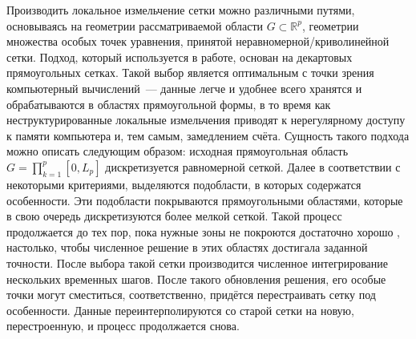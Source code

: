 Производить локальное измельчение сетки можно различными путями, основываясь на геометрии рассматриваемой области $G\subset\mathbb{R}^p$, геометрии множества особых точек уравнения, принятой неравномерной/криволинейной сетки.
Подход, который используется в работе, основан на декартовых прямоугольных сетках.
Такой выбор является оптимальным с точки зрения компьютерный вычислений~--- данные легче и удобнее всего хранятся и обрабатываются в областях прямоугольной формы, в то время как неструктурированные локальные измельчения приводят к нерегулярному доступу к памяти компьютера и, тем самым, замедлением счёта.
Сущность такого подхода можно описать следующим образом: исходная прямоугольная область
$
    G = \prod_{k = 1}^{p} [0, L_p]
$
дискретизуется равномерной сеткой.
Далее в соответствии с некоторыми критериями, выделяются подобласти, в которых содержатся особенности.
Эти подобласти покрываются прямоугольными областями, которые в свою очередь дискретизуются более мелкой сеткой.
Такой процесс продолжается до тех пор, пока нужные зоны \glqq не покроются достаточно хорошо \grqq, настолько, чтобы численное решение в этих областях достигала заданной точности.
После выбора такой сетки производится численное интегрирование нескольких временных шагов.
После такого обновления решения, его особые точки могут сместиться, соответственно, придётся перестраивать сетку под особенности.
Данные переинтерполируются со старой сетки на новую, перестроенную, и процесс продолжается снова.

